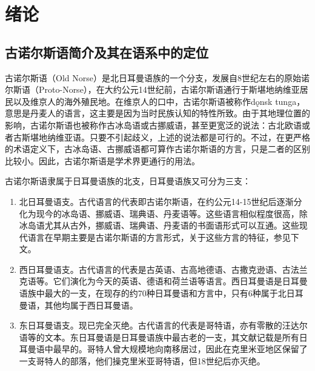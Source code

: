 
% 
\chapter*{绪论}
\section*{古诺尔斯语简介及其在语系中的定位}
古诺尔斯语（Old Norse）是北日耳曼语族的一个分支，发展自8世纪左右的原始诺尔斯语（Proto-Norse），在大约公元14世纪前，古诺尔斯语通行于斯堪地纳维亚居民以及维京人的海外殖民地。在维京人的口中，古诺尔斯语被称作dǫnsk tunga，意思是丹麦人的语言，这主要是因为当时民族认知的特性所致。由于其地理位置的影响，古诺尔斯语也被称作古冰岛语或古挪威语，甚至更宽泛的说法：古北欧语或者古斯堪地纳维亚语。只要不引起歧义，上述的说法都是可行的。不过，在更严格的术语定义下，古冰岛语、古挪威语都可算作古诺尔斯语的方言，只是二者的区别比较小。因此，古诺尔斯语是学术界更通行的用法。

古诺尔斯语隶属于日耳曼语族的北支，日耳曼语族又可分为三支：
\begin{enumerate}
    \item 北日耳曼语支。古代语言的代表即古诺尔斯语，在约公元14-15世纪后逐渐分化为现今的冰岛语、挪威语、瑞典语、丹麦语等。这些语言相似程度很高，除冰岛语尤其从古外，挪威语、瑞典语、丹麦语的书面语形式可以互通。这些现代语言在早期主要是古诺尔斯语的方言形式，关于这些方言的特征，参见下文。

    \item 西日耳曼语支。古代语言的代表是古英语、古高地德语、古撒克逊语、古法兰克语等。它们演化为今天的英语、德语和荷兰语等语言。西日耳曼语是日耳曼语族中最大的一支，在现存的约70种日耳曼语和方言中，只有6种属于北日耳曼语，其他均属于西日耳曼语。

    \item 东日耳曼语支。现已完全灭绝。古代语言的代表是哥特语，亦有零散的汪达尔语等的文本。东日耳曼语是日耳曼语族中最古老的一支，其文献记载是所有日耳曼语中最早的。哥特人曾大规模地向南移居过，因此在克里米亚地区保留了一支哥特人的部落，他们操克里米亚哥特语，但18世纪后亦灭绝。
\end{enumerate} 

